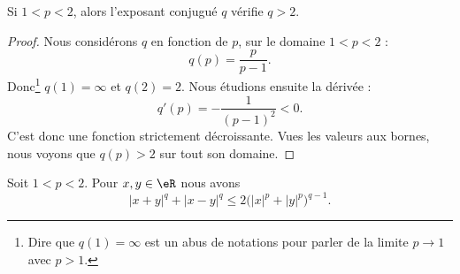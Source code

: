 \begin{lemma}       \label{LEMooFGKXooZCHNln}
	Si \( 1<p<2\), alors l'exposant conjugué \( q\) vérifie \( q>2\).
\end{lemma}

\begin{proof}
	Nous considérons \( q\) en fonction de \( p\), sur le domaine \( 1<p<2\) :
	\begin{equation}
		q(p)=\frac{ p }{ p-1 }.
	\end{equation}
	Donc\footnote{Dire que \( q(1)=\infty\) est un abus de notations pour parler de la limite \( p\to 1\) avec \( p>1\).} \( q(1)=\infty\) et \( q(2)=2\). Nous étudions ensuite la dérivée :
	\begin{equation}
		q'(p)=-\frac{1}{ (p-1)^2 }<0.
	\end{equation}
	C'est donc une fonction strictement décroissante. Vues les valeurs aux bornes, nous voyons que \( q(p)>2\) sur tout son domaine.
\end{proof}

\begin{lemma}         \label{LEMooMKIXooVOYaxI}
	Soit \( 1<p<2\). Pour \( x,y\in \eR\) nous avons
	\begin{equation}
		| x+y |^q+| x-y |^q\leq 2\big( | x |^p+| y |^p \big)^{q-1}.
	\end{equation}
\end{lemma}

